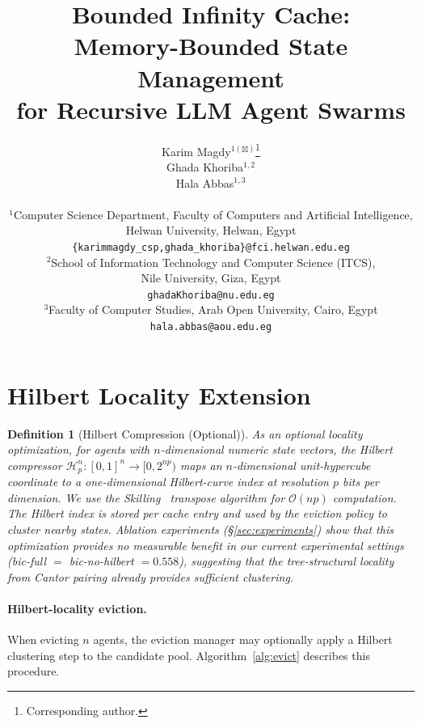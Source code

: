 \documentclass{article}
\title{Bounded Infinity Cache: \\ Memory-Bounded State Management \\ for Recursive LLM Agent Swarms}
\author{
  Karim Magdy$^{1(\boxtimes)}$\thanks{Corresponding author.} \\
  \And
  Ghada Khoriba$^{1,2}$ \\
  \And
  Hala Abbas$^{1,3}$ \\
  \\
  $^1$Computer Science Department, Faculty of Computers and Artificial Intelligence, \\
  Helwan University, Helwan, Egypt \\
  \texttt{\{karimmagdy\_csp,ghada\_khoriba\}@fci.helwan.edu.eg} \\
  $^2$School of Information Technology and Computer Science (ITCS), \\
  Nile University, Giza, Egypt \\
  \texttt{ghadaKhoriba@nu.edu.eg} \\
  $^3$Faculty of Computer Studies, Arab Open University, Cairo, Egypt \\
  \texttt{hala.abbas@aou.edu.eg}
}
\newtheorem{definition}{Definition}
\newcommand{\hilbert}{\mathcal{H}}
\newcommand{\Oh}{\mathcal{O}}
\begin{document}
\maketitle











\newpage
\appendix


\section{Hilbert Locality Extension}
\label{app:hilbert}

\begin{definition}[Hilbert Compression (Optional)]
\label{def:hilbert}
As an optional locality optimization, for agents with $n$-dimensional
numeric state vectors, the \emph{Hilbert compressor}
$\hilbert_p^n: [0,1]^n \to [0, 2^{np})$ maps an $n$-dimensional
unit-hypercube coordinate to a one-dimensional Hilbert-curve index at
resolution $p$ bits per dimension.  We use the
Skilling~\citep{skilling2004hilbert} transpose algorithm for
$\Oh(np)$ computation.  The Hilbert index is stored per cache entry
and used by the eviction policy to cluster nearby states.  Ablation
experiments (\S\ref{sec:experiments}) show that this optimization
provides no measurable benefit in our current experimental settings
(bic-full $=$ bic-no-hilbert $= 0.558$), suggesting that the
tree-structural locality from Cantor pairing already provides
sufficient clustering.
\end{definition}

\paragraph{Hilbert-locality eviction.}
When evicting $n$ agents, the eviction manager may optionally apply a
Hilbert clustering step to the candidate pool.  Algorithm~\ref{alg:evict}
describes this procedure.
\end{document}
